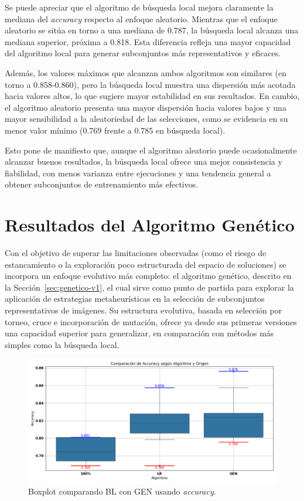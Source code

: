 Se puede apreciar que el algoritmo de búsqueda local mejora claramente la mediana del \textit{accuracy} respecto al enfoque aleatorio.
Mientras que el enfoque aleatorio se sitúa en torno a una mediana de 0.787, la búsqueda local alcanza una mediana superior, próxima a 0.818.
Esta diferencia refleja una mayor capacidad del algoritmo local para generar subconjuntos más representativos y eficaces.

Además, los valores máximos que alcanzan ambos algoritmos son similares (en torno a 0.858-0.860),
pero la búsqueda local muestra una dispersión más acotada hacia valores altos, lo que sugiere mayor estabilidad en sus resultados.
En cambio, el algoritmo aleatorio presenta una mayor dispersión hacia valores bajos y una mayor sensibilidad a la aleatoriedad de las selecciones,
como se evidencia en su menor valor mínimo (0.769 frente a 0.785 en búsqueda local).

Esto pone de manifiesto que, aunque el algoritmo aleatorio puede ocasionalmente alcanzar buenos resultados,
la búsqueda local ofrece una mejor consistencia y fiabilidad, con menos varianza entre ejecuciones y una tendencia general a obtener subconjuntos de entrenamiento más efectivos.


\section{Resultados del Algoritmo Genético}\label{sec:resultados-algoritmo-genetico}
Con el objetivo de superar las limitaciones observadas (como el riesgo de estancamiento o la exploración poco estructurada del espacio de soluciones)
se incorpora un enfoque evolutivo más completo: el algoritmo genético, descrito en la Sección~\ref{sec:genetico-v1}, el cual sirve como punto de partida para explorar la
aplicación de estrategias metaheurísticas en la selección de subconjuntos representativos de imágenes.
Su estructura evolutiva, basada en selección por torneo, cruce e incorporación de mutación,
ofrece ya desde sus primeras versiones una capacidad superior para generalizar, en comparación con métodos más simples como la búsqueda local.

\begin{figure}[htp]
    \centering
    \includegraphics[width=1\textwidth]{imagenes/evaluaciones/comparacion_bl-gen_v1}
    \caption{Boxplot comparando BL con GEN usando \textit{accuracy}.}
    \label{fig:bl-vs-gen-v1}
\end{figure}

